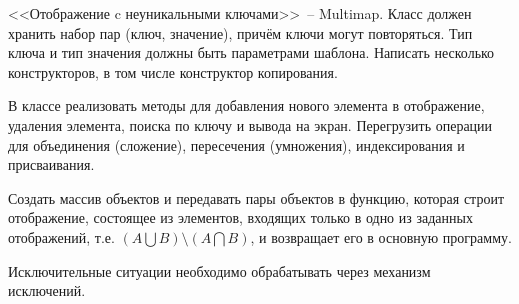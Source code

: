 
<<Отображение c неуникальными ключами>>~-- Multimap. Класс должен хранить набор
пар (ключ, значение), причём ключи могут повторяться. Тип ключа и тип значения должны
быть параметрами шаблона. Написать несколько конструкторов, в том числе конструктор
копирования.

В классе реализовать методы для добавления нового элемента в
отображение, удаления элемента, поиска по ключу и вывода на экран. Перегрузить
операции для объединения (сложение), пересечения (умножения), индексирования и
присваивания.

Создать массив объектов и передавать пары объектов в функцию, которая
строит отображение, состоящее из элементов, входящих только в одно из заданных
отображений, т.е. $(A\bigcup B) \setminus (A\bigcap B)$, и возвращает его в основную программу.

Исключительные ситуации необходимо обрабатывать через механизм исключений.
